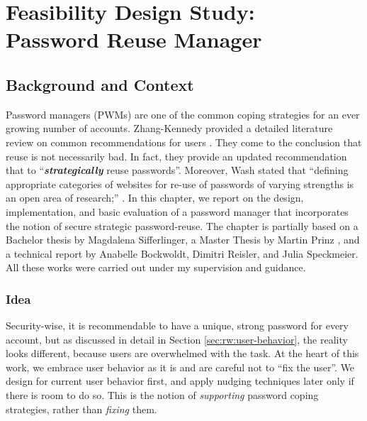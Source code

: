 \chapter[Feasibility Design Study: Password Reuse Manager]{Feasibility Design Study: \\Password Reuse Manager}\label{chap:pwrm}

\section{Background and Context}
Password managers (PWMs) are one of the common coping strategies for an ever growing number of accounts. 
Zhang-Kennedy \etal provided a detailed literature review on common recommendations for users \cite{ZhangKennedy2016RevisitingPasswordRules}. They come to the conclusion that reuse is not necessarily bad. In fact, they provide an updated recommendation that to ``\textit{\textbf{strategically}} reuse passwords''. Moreover, Wash \etal stated that ``defining appropriate categories of websites for re-use of passwords of varying strengths is an open area of research;'' \cite{Wash2016UnderstandingPasswordChoices}. In this chapter, we report on the design, implementation, and basic evaluation of a password manager that incorporates the notion of secure strategic password-reuse. The chapter is partially based on a Bachelor thesis by Magdalena Sifferlinger, a Master Thesis by Martin Prinz \cite{Prinz2017Thesis}, and a technical report by Anabelle Bockwoldt, Dimitri Reisler, and Julia Speckmeier. All these works were carried out under my supervision and guidance. \ar

\subsection{Idea}
Security-wise, it is recommendable to have a unique, strong password for every account, but as discussed in detail in Section \ref{sec:rw:user-behavior}, the reality looks different, because users are overwhelmed with the task. At the heart of this work, we embrace user behavior as it is and are careful not to ``fix the user''. We design for current user behavior first, and apply nudging techniques later only if there is room to do so. This is the notion of \textit{supporting} password coping strategies, rather than \textit{fixing} them. 

